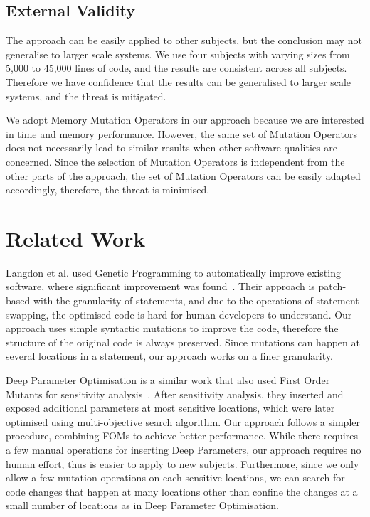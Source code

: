 \documentclass[oribibl]{llncs}
\begin{document}
\subsection{External Validity}
\label{sec_externalvalidity}

The approach can be easily applied to other subjects, but the conclusion may not generalise to larger scale systems.
We use four subjects with varying sizes from 5,000 to 45,000 lines of code, and the results are consistent across all subjects.
Therefore we have confidence that the results can be generalised to larger scale systems, and the threat is mitigated.

We adopt Memory Mutation Operators in our approach because we are interested in time and memory performance.
However, the same set of Mutation Operators does not necessarily lead to similar results when other software qualities are concerned.
Since the selection of Mutation Operators is independent from the other parts of the approach, the set of Mutation Operators can be easily adapted accordingly, therefore, the threat is minimised.

\section{Related Work}
\label{sec_related}

Langdon et al. used Genetic Programming to automatically improve existing software, where significant improvement was found~\cite{6733370,Langdon:2014:IMI:2576768.2598244}.
Their approach is patch-based with the granularity of statements, and due to the operations of statement swapping, the optimised code is hard for human developers to understand.
Our approach uses simple syntactic mutations to improve the code, therefore the structure of the original code is always preserved.
Since mutations can happen at several locations in a statement, our approach works on a finer granularity.

Deep Parameter Optimisation is a similar work that also used First Order Mutants for sensitivity analysis~\cite{Wu:2015:DPO:2739480.2754648}.
After sensitivity analysis, they inserted and exposed additional parameters at most sensitive locations, which were later optimised using multi-objective search algorithm.
Our approach follows a simpler procedure, combining FOMs to achieve better performance.
While there requires a few manual operations for inserting Deep Parameters, our approach requires no human effort, thus is easier to apply to new subjects.
Furthermore, since we only allow a few mutation operations on each sensitive locations, we can search for code changes that happen at many locations other than confine the changes at a small number of locations as in Deep Parameter Optimisation.
\end{document}
